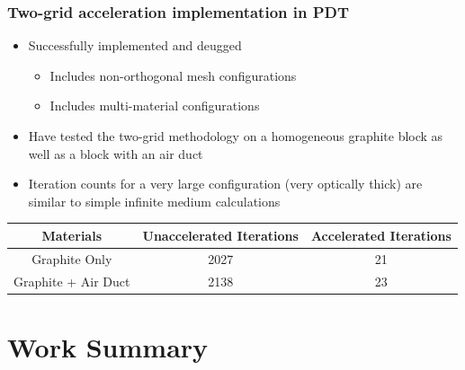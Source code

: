 \documentclass[compress,10pt]{beamer}
\begin{document}
\begin{frame}[t]\frametitle{Two-grid acceleration implementation in PDT}
\begin{block}{}
\begin{itemize}
	\item Successfully implemented and deugged
	\begin{itemize}
		\item Includes non-orthogonal  mesh configurations
		\item Includes multi-material configurations
	\end{itemize}
	\item Have tested the two-grid methodology on a homogeneous graphite block as well as a block with an air duct
	\item Iteration counts for a very large configuration (very optically thick) are similar to simple infinite medium calculations
\end{itemize}
\end{block}
\centering
\vspace{1cm}
\begin{table}
\footnotesize
\begin{tabular}{|c|c|c|}
\hline
Materials & Unaccelerated Iterations & Accelerated Iterations  \\
\hline \hline
Graphite Only & 2027 & 21 \\ \hline
Graphite + Air Duct & 2138 & 23 \\ \hline
\end{tabular}
\end{table}
\end{frame}
\typeout{***********************************************************************************}

\section{Work Summary}
\end{document}

